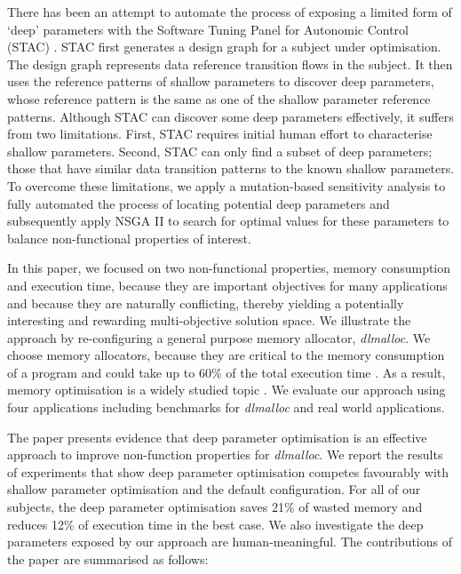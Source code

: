 There has been an attempt to automate the process of exposing a limited form of `deep' parameters with the Software Tuning Panel for Autonomic Control (STAC) \cite{Brake:2008:ADS:1370018.1370031}. STAC first generates a design graph for a subject under optimisation. The design graph represents data reference transition flows in the subject. It then uses the reference patterns of shallow parameters to discover deep parameters, whose reference pattern is the same as one of the shallow parameter reference patterns. Although STAC can discover some deep parameters effectively, it suffers from two limitations. First, STAC requires initial human effort to characterise shallow parameters. Second, STAC can only find a subset of deep parameters; those that have similar data transition patterns to the known shallow parameters. To overcome these limitations, we apply a mutation-based sensitivity analysis to fully automated the process of locating potential deep parameters and subsequently apply NSGA II to search for optimal values for these parameters to balance non-functional properties of interest. 

In this paper, we focused on two non-functional properties, memory consumption and execution time, because they are important objectives for many applications and because they are naturally conflicting, thereby yielding a potentially interesting and rewarding multi-objective solution space. We illustrate the approach by re-configuring a general purpose memory allocator, \emph{dlmalloc}. We choose memory allocators, because they are critical to the memory consumption of a program and could take up to 60\% of the total execution time \cite{Zorn:1992:EMS:142181.142200}. As a result, memory optimisation is a widely studied topic \cite{Risco-Martin:2009:ODM:1569901.1570116,RiscoMartin2010572}. We evaluate our approach using four applications including benchmarks for \emph{dlmalloc} and real world applications.

The paper presents evidence that deep parameter optimisation is an effective approach to improve non-function properties for \emph{dlmalloc}. 
We report the results of experiments that show deep parameter optimisation competes favourably with shallow parameter optimisation and the default configuration. For all of our subjects, the deep parameter optimisation saves 21\% of wasted memory and reduces 12\% of execution time in the best case. We also investigate the deep parameters exposed by our approach are human-meaningful. The contributions of the paper are summarised as follows:


